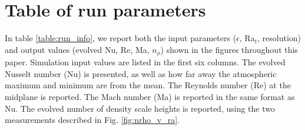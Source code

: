 \documentclass[aps, prfluids, onecolumn, notitlepage, nofootinbib, groupedaddress, amsfonts, amssymb, amsmath]{revtex4-1}
\begin{document}


\appendix
\section{Table of run parameters}
In table \ref{table:run_info}, we report both the input parameters ($\epsilon$, Ra$_t$, resolution)
and output values (evolved Nu, Re, Ma, $n_\rho$) shown in the figures throughout this paper.
Simulation input values are listed in the first six columns.  The evolved Nusselt
number (Nu) is presented, as well as how far away the atmospheric maximum and minimum are from
the mean.  The Reynolds number (Re) at the midplane is reported.  The Mach number (Ma) is reported
in the same format as Nu.  The evolved number of density scale heights is reported, using the two
measurements described in Fig. \ref{fig:nrho_v_ra}.
\end{document}
